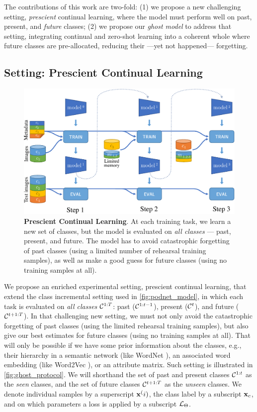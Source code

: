 The contributions of this work are two-fold: (1) we propose a new challenging setting,
\textit{prescient} continual learning, where the model must perform well on past, present, and
\textit{future} classes; (2) we propose our \textit{ghost model} to address that setting,
integrating continual and zero-shot learning into a coherent whole where future classes are
pre-allocated, reducing their ---yet not happened--- forgetting.


\subsection{Setting: Prescient Continual Learning}
\label{sec:ghost_setting}

\begin{figure}
    \centering
    \includegraphics[width=0.7\linewidth]{images/ghost/protocol.pdf}
    \caption{\textbf{Prescient Continual Learning}. At each training task, we learn a new set of
        classes, but the model is evaluated on \textit{all classes} --- past, present, and future.
        The model has to avoid catastrophic forgetting of past classes (using a limited number of
        rehearsal training samples), as well as make a good guess for future classes (using no
        training samples at all).}
    \label{fig:ghost_protocol}
\end{figure}


We propose an enriched experimental setting, prescient continual learning, that extend the class
incremental setting used in \autoref{fig:podnet_model}, in which each task is evaluated on
\textit{all classes} $\mathcal{C}^{1:T}$: past ($\mathcal{C}^{1:t-1}$), present ($\mathcal{C}^t$), and future
($\mathcal{C}^{t+1:T}$). In that challenging new setting, we must not only avoid the catastrophic
forgetting of past classes (using the limited rehearsal training samples), but also give our best
estimates for future classes (using no training samples at all). That will only be possible if we
have some prior information about the classes, e.g., their hierarchy in a semantic network (like
WordNet \citep{fellbaum1998wordnet}), an associated word embedding (like Word2Vec
\citep{mikolov2013word2vec}), or an attribute matrix. Such setting is illustrated in
\autoref{fig:ghost_protocol}. We will shorthand the set of past and present classes $\mathcal{C}^{1:t}$ as
the \textit{seen} classes, and the set of future classes $\mathcal{C}^{t+1:T}$ as the \textit{unseen}
classes. We denote individual samples by a superscript $\mathbf{x}^(i)$, the class label by a subscript
$\mathbf{x}_c$, and on which parameters a loss is applied by a subscript $\mathcal{L}_\Theta$.

